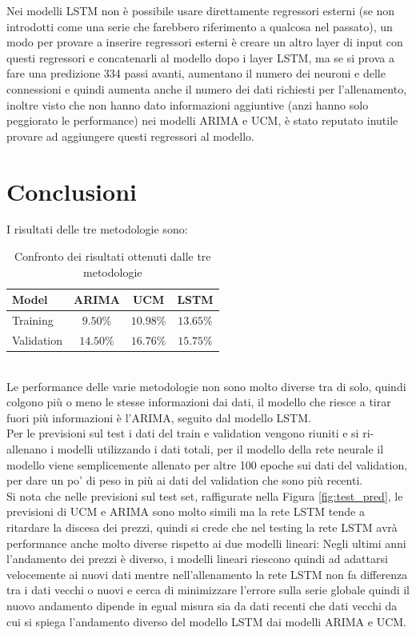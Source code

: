 \documentclass[12pt, onecolumn]{article}
\begin{document}
Nei modelli LSTM non è possibile usare direttamente regressori esterni (se non introdotti come una serie che farebbero riferimento a qualcosa nel passato), un modo per provare a inserire regressori esterni è creare un altro layer di input con questi regressori e concatenarli al modello dopo i layer LSTM, ma se si prova a fare una predizione 334 passi avanti, aumentano il numero dei neuroni e delle connessioni e quindi aumenta anche il numero dei dati richiesti per l'allenamento, inoltre visto che non hanno dato informazioni aggiuntive (anzi hanno solo peggiorato le performance) nei modelli ARIMA e UCM, è stato reputato inutile provare ad aggiungere questi regressori al modello.
\section*{Conclusioni}
I risultati delle tre metodologie sono:
\begin{table}[!h]
  \centering
  \begin{tabular}{|l|c|c|c|}
    \hline
    Model & ARIMA & UCM & LSTM\\
    \hline
    Training & $9.50\%$ & $10.98\%$ & $13.65\%$\\
    Validation & $14.50\%$ & $16.76\%$ & $15.75\%$\\
    \hline
  \end{tabular}
  \caption{Confronto dei risultati ottenuti dalle tre metodologie }
  \label{tab:confronto}
\end{table}\\
Le performance delle varie metodologie non sono molto diverse tra di solo, quindi colgono più o meno le stesse informazioni dai dati, il modello che riesce a tirar fuori più informazioni è l'ARIMA, seguito dal modello LSTM.\\
Per le previsioni sul test i dati del train e validation vengono riuniti e si ri-allenano i modelli utilizzando i dati totali, per il modello della rete neurale il modello viene semplicemente allenato per altre 100 epoche sui dati del validation, per dare un po' di peso in più ai dati del validation che sono più recenti.\\
Si nota che nelle previsioni sul test set, raffigurate nella Figura \ref{fig:test_pred}, le previsioni di UCM e ARIMA sono molto simili ma la rete LSTM tende a ritardare la discesa dei prezzi, quindi si crede che nel testing la rete LSTM avrà performance anche molto diverse rispetto ai due modelli lineari: Negli ultimi anni l'andamento dei prezzi è diverso, i modelli lineari riescono quindi ad adattarsi velocemente ai nuovi dati mentre nell'allenamento la rete LSTM non fa differenza tra i dati vecchi o nuovi e cerca di minimizzare l'errore sulla serie globale quindi il nuovo andamento dipende in egual misura sia da dati recenti che dati vecchi da cui si spiega l'andamento diverso del modello LSTM dai modelli ARIMA e UCM.
\end{document}
